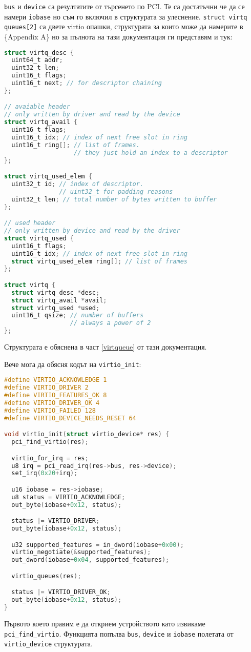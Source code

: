 {\tt bus} и {\tt device} са резултатите от търсенето по PCI. Те са достатъчни че да се намери {\tt iobase} но съм го включил в структурата за улеснение. {\tt struct virtq queues[2]} са двете virtio опашки, структурата за които може да намерите в \{Appendix A\} но за пълнота на тази документация ги представям и тук:
\begin{lstlisting}[language=C]
struct virtq_desc {
  uint64_t addr;
  uint32_t len;
  uint16_t flags;
  uint16_t next; // for descriptor chaining
};

// avaiable header
// only written by driver and read by the device
struct virtq_avail {
  uint16_t flags;
  uint16_t idx; // index of next free slot in ring
  uint16_t ring[]; // list of frames.
                   // they just hold an index to a descriptor
};

struct virtq_used_elem {
  uint32_t id; // index of descriptor.
               // uint32_t for padding reasons
  uint32_t len; // total number of bytes written to buffer
};

// used header
// only written by device and read by the driver
struct virtq_used {
  uint16_t flags;
  uint16_t idx; // index of next free slot in ring
  struct virtq_used_elem ring[]; // list of frames
};

struct virtq {
  struct virtq_desc *desc;
  struct virtq_avail *avail;
  struct virtq_used *used;
  uint16_t qsize; // number of buffers
                  // always a power of 2
};
\end{lstlisting}
Структурата е обяснена в част \ref{virtqueue} от тази документация.

Вече мога да обясня кодът на {\tt virtio\_init}:
\begin{lstlisting}[language=C]
#define VIRTIO_ACKNOWLEDGE 1
#define VIRTIO_DRIVER 2
#define VIRTIO_FEATURES_OK 8
#define VIRTIO_DRIVER_OK 4
#define VIRTIO_FAILED 128
#define VIRTIO_DEVICE_NEEDS_RESET 64

void virtio_init(struct virtio_device* res) {
  pci_find_virtio(res);

  virtio_for_irq = res;
  u8 irq = pci_read_irq(res->bus, res->device);
  set_irq(0x20+irq);

  u16 iobase = res->iobase;
  u8 status = VIRTIO_ACKNOWLEDGE;
  out_byte(iobase+0x12, status);

  status |= VIRTIO_DRIVER;
  out_byte(iobase+0x12, status);

  u32 supported_features = in_dword(iobase+0x00);
  virtio_negotiate(&supported_features);
  out_dword(iobase+0x04, supported_features);

  virtio_queues(res);

  status |= VIRTIO_DRIVER_OK;
  out_byte(iobase+0x12, status);
}
\end{lstlisting}
Първото което правим е да открием устройството като извикаме {\tt pci\_find\_virtio}. Функцията попълва {\tt bus}, {\tt device} и {\tt iobase} полетата от {\tt virtio\_device} структурата.

